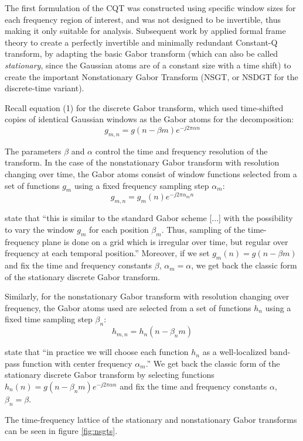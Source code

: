 \documentclass[letter,12pt]{article}
\begin{document}
The first formulation of the CQT was constructed using specific window sizes for each frequency region of interest, and was not designed to be invertible, thus making it only suitable for analysis. Subsequent work by \cite{balazs, jaillet} applied formal frame theory to create a perfectly invertible and minimally redundant Constant-Q transform, by adapting the basic Gabor transform (which can also be called \textit{stationary}, since the Gaussian atoms are of a constant size with a time shift) to create the important Nonstationary Gabor Transform (NSGT, or NSDGT for the discrete-time variant).

Recall equation (1) for the discrete Gabor transform, which used time-shifted copies of identical Gaussian windows as the Gabor atoms for the decomposition:
\[ g_{m,n} = g(n-\beta m)e^{-j2\pi \alpha n} \]

The parameters $\beta$ and $\alpha$ control the time and frequency resolution of the transform. In the case of the nonstationary Gabor transform with resolution changing over time, the Gabor atoms consist of window functions selected from a set of functions $g_{m}$ using a fixed frequency sampling step $\alpha_{m}$:
\[ g_{m,n} = g_{m}(n)e^{-j2\pi \alpha_{m} n} \]

\citet{balazs} state that ``this is similar to the standard Gabor scheme [...] with the possibility to vary the window $g_{m}$ for each position $\beta_{m}$. Thus, sampling of the time-frequency plane is done on a grid which is irregular over time, but regular over frequency at each temporal position.'' Moreover, if we set $g_{m}(n) = g(n - \beta m)$ and fix the time and frequency constants $\beta$, $\alpha_{m} = \alpha$, we get back the classic form of the stationary discrete Gabor transform.

Similarly, for the nonstationary Gabor transform with resolution changing over frequency, the Gabor atoms used are selected from a set of functions $h_{n}$ using a fixed time sampling step $\beta_{n}$:
\[ h_{m,n} = h_{n}(n - \beta_{n}m) \]

\citet{balazs} state that ``in practice we will choose each function $h_{n}$ as a well-localized band-pass function with center frequency $\alpha_{m}$.'' We get back the classic form of the stationary discrete Gabor transform by selecting functions $h_{n}(n) = g(n - \beta_{n} m)e^{-j2\pi \alpha n}$ and fix the time and frequency constants $\alpha$, $\beta_{n} = \beta$.

The time-frequency lattice of the stationary and nonstationary Gabor transforms can be seen in figure \ref{fig:nsgts}.
\end{document}
